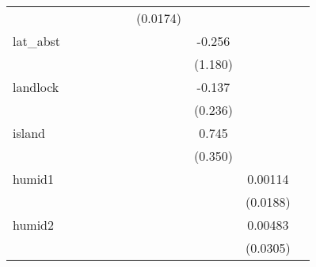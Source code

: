 {\begin{tabular}{l*{9}{c}}
            &                     &                     &                     &                     &                     &    (0.0174)         &                     &                     &                     \\
[1em]
lat\_abst    &                     &                     &                     &                     &                     &                     &      -0.256         &                     &                     \\
            &                     &                     &                     &                     &                     &                     &     (1.180)         &                     &                     \\
[1em]
landlock    &                     &                     &                     &                     &                     &                     &      -0.137         &                     &                     \\
            &                     &                     &                     &                     &                     &                     &     (0.236)         &                     &                     \\
[1em]
island      &                     &                     &                     &                     &                     &                     &       0.745\sym{**} &                     &                     \\
            &                     &                     &                     &                     &                     &                     &     (0.350)         &                     &                     \\
[1em]
humid1      &                     &                     &                     &                     &                     &                     &                     &     0.00114         &                     \\
            &                     &                     &                     &                     &                     &                     &                     &    (0.0188)         &                     \\
[1em]
humid2      &                     &                     &                     &                     &                     &                     &                     &     0.00483         &                     \\
            &                     &                     &                     &                     &                     &                     &                     &    (0.0305)         &                     \\

\end{tabular}}
